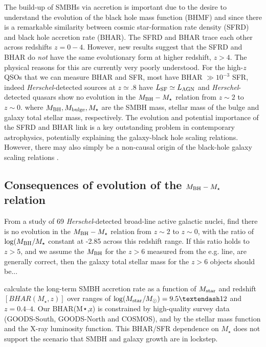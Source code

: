
The build-up of SMBHs via accretion is important due to the desire to
understand the evolution of the black hole mass function (BHMF) and
since there is a remarkable similarity between cosmic star-formation
rate density (SFRD) and black hole accretion rate (BHAR). The SFRD and
BHAR trace each other \citep[with a normalisation factor of
$\sim3000$,][]{Willott2013b, MadauDickinson2014} across redshifts
$z=0-4$.  However, new results \citep[e.g., ][]{Vito2018a, Calhau2018}
suggest that the SFRD and BHAR do {\it not} have the same evolutionary form
at higher redshift, $z>4$. The physical reasons for this are currently very poorly
understood.  For the high-$z$ QSOs that we can measure BHAR and SFR, most
have BHAR $\gg 10^{-3}$ SFR, indeed {\it Herschel}-detected sources at
$z\simeq.8$ have $L_{\rm SF} \simeq L_{\rm AGN}$ \citep[e.g.,
][]{Netzer2014} and {\it Herschel}-detected quasars show no evolution
in the $M_{\rm BH} - M_{\star}$ relation from $z\sim2$ to $z\sim0$.
where $M_{\rm BH}, M_{\rm bulge}, M_{\star}$ are the SMBH mass,
stellar mass of the bulge and galaxy total stellar mass,
respectively. The evolution and potential importance of the SFRD and BHAR 
link is a key outstanding problem in contemporary astrophysics, 
potentially explaining the galaxy-black hole scaling relations. 
However, there may also simply be a non-causal origin of the black-hole 
galaxy scaling relations \citep{Jahnke2011}.





\subsection{Consequences of evolution of the $M_{\rm BH} - M_{\star}$ relation}
From a study of 69 {\it Herschel}-detected broad-line active galactic
nuclei, \citet{Sun2015} find there is no evolution in the $M_{\rm BH}
- M_{\star}$ relation from $z\sim2$ to $z\sim0$, with the ratio of
$\log (M_{\rm BH} / M_{\star}$ constant at -2.85 across this redshift
range. If this ratio holds to $z>5$, and we assume the $M_{\rm BH}$
for the $z>6$ measured from the e.g. \mgii line, are generally
correct, then the galaxy total stellar mass for the $z>6$ objects
should be...

\citet{YangG2018} calculate the long-term SMBH accretion rate as a
function of $M_{\rm star}$ and redshift $[BHAR(M_{\star} ,z)]$ over
ranges of $\log (M_{\rm star} / M_{\odot}) = 9.5–12$ and $z = 0.4–4$.
Our BHAR(M⋆,z) is constrained by high-quality survey data
(GOODS-South, GOODS-North and COSMOS), and by the stellar mass
function and the X-ray luminosity function.  This BHAR/SFR dependence
on $M_{\star}$ does not support the scenario that SMBH and galaxy
growth are in lockstep.